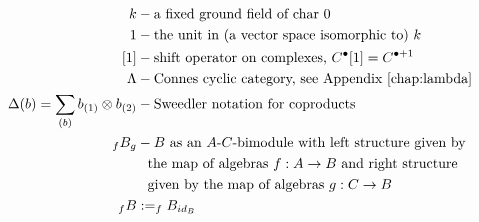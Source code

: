 \begin{align*}
k 
&-
\textrm{a fixed ground field of char 0}\\
%
1
&-
\textrm{the unit in (a vector space 
isomorphic to) $k$}\\
%
[1]
&-
\textrm{shift operator on complexes, }
C^\bullet[1] = C^{\bullet+1}\\
\Lambda
&-
\textrm{Connes cyclic category, 
see Appendix \ref{chap:lambda}}\\
%
\Delta(b) = \sum_{(b)} b_{(1)} \otimes b_{(2)}
&-
\textrm{Sweedler notation for coproducts}\\
%
_fB_g 
&- 
\textrm{$B$ as an $A$-$C$-bimodule with left 
structure given by}\\
&\phantom{-} \textrm{the map of algebras $f:A\to B$ 
and right structure}\\
&\phantom{-} \textrm{given by the map of algebras 
$g:C \to B$}\\
%
_fB
&:=
_fB_{id_B}
\end{align*}